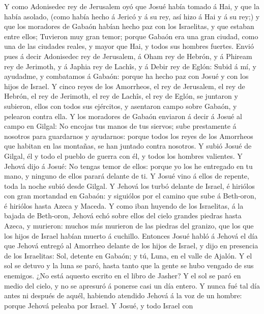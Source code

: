  Y como Adonisedec rey de Jerusalem oyó que Josué había
tomado á Hai, y que la había asolado, (como había hecho á Jericó y á su
rey, así hizo á Hai y á su rey;) y que los moradores de Gabaón habían
hecho paz con los Israelitas, y que estaban entre ellos; 
Tuvieron muy gran temor; porque Gabaón era una gran ciudad, como una de
las ciudades reales, y mayor que Hai, y todos sus hombres fuertes.
 Envió pues á decir Adonisedec rey de Jerusalem, á Oham
rey de Hebrón, y á Phiream rey de Jerimoth, y á Japhia rey de Lachîs, y
á Debir rey de Eglón:  Subid á mí, y ayudadme, y
combatamos á Gabaón: porque ha hecho paz con Josué y con los hijos de
Israel.  Y cinco reyes de los Amorrheos, el rey de
Jerusalem, el rey de Hebrón, el rey de Jerimoth, el rey de Lachîs, el
rey de Eglón, se juntaron y subieron, ellos con todos sus ejércitos, y
asentaron campo sobre Gabaón, y pelearon contra ella.  Y
los moradores de Gabaón enviaron á decir á Josué al campo en Gilgal: No
encojas tus manos de tus siervos; sube prestamente á nosotros para
guardarnos y ayudarnos: porque todos los reyes de los Amorrheos que
habitan en las montañas, se han juntado contra nosotros. 
Y subió Josué de Gilgal, él y todo el pueblo de guerra con él, y todos
los hombres valientes.  Y Jehová dijo á Josué: No tengas
temor de ellos: porque yo los he entregado en tu mano, y ninguno de
ellos parará delante de ti.  Y Josué vino á ellos de
repente, toda la noche subió desde Gilgal.  Y Jehová los
turbó delante de Israel, é hiriólos con gran mortandad en Gabaón: y
siguiólos por el camino que sube á Beth-oron, é hiriólos hasta Azeca y
Maceda.  Y como iban huyendo de los Israelitas, á la
bajada de Beth-oron, Jehová echó sobre ellos del cielo grandes piedras
hasta Azeca, y murieron: muchos más murieron de las piedras del granizo,
que los que los hijos de Israel habían muerto á cuchillo.
 Entonces Josué habló á Jehová el día que Jehová entregó
al Amorrheo delante de los hijos de Israel, y dijo en presencia de los
Israelitas: Sol, detente en Gabaón; y tú, Luna, en el valle de Ajalón.
 Y el sol se detuvo y la luna se paró, hasta tanto que la
gente se hubo vengado de sus enemigos. ¿No está aquesto escrito en el
libro de Jasher? Y el sol se paró en medio del cielo, y no se apresuró á
ponerse casi un día entero.  Y nunca fué tal día antes ni
después de aquél, habiendo atendido Jehová á la voz de un hombre: porque
Jehová peleaba por Israel.  Y Josué, y todo Israel con
